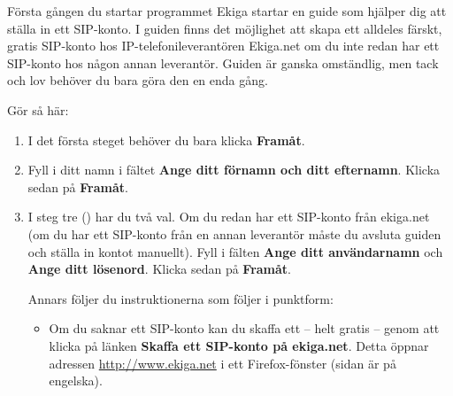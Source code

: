 \documentclass[a4paper,final]{memoir} %
\begin{document}

Första gången du startar programmet Ekiga startar en guide som hjälper dig att ställa in ett SIP-konto. I guiden finns det möjlighet att skapa ett alldeles färskt, gratis SIP-konto hos IP-telefonileverantören Ekiga.net om du inte redan har ett SIP-konto hos någon annan leverantör. Guiden är ganska omständlig, men tack och lov behöver du bara göra den en enda gång.	

Gör så här:

\begin{enumerate}

\item I det första steget behöver du bara klicka \textbf{Framåt}.

\item Fyll i ditt namn i fältet \textbf{Ange ditt förnamn och ditt efternamn}. Klicka sedan på \textbf{Framåt}.

\item I steg tre  () har du två val. Om du redan har ett SIP-konto från ekiga.net (om du har ett SIP-konto från en annan leverantör måste du avsluta guiden och ställa in kontot manuellt). Fyll i fälten \textbf{Ange ditt användarnamn} och \textbf{Ange ditt lösenord}. Klicka sedan på \textbf{Framåt}. 


Annars följer du instruktionerna som följer i punktform:


\begin{itemize}


\item Om du saknar ett SIP-konto kan du skaffa ett -- helt gratis -- genom att klicka på länken \textbf{Skaffa ett SIP-konto på ekiga.net}. Detta öppnar adressen \url{http://www.ekiga.net} i ett Firefox-fönster (sidan är på engelska).

\xnegskip{}


\end{itemize}
\end{enumerate}
\end{document}
